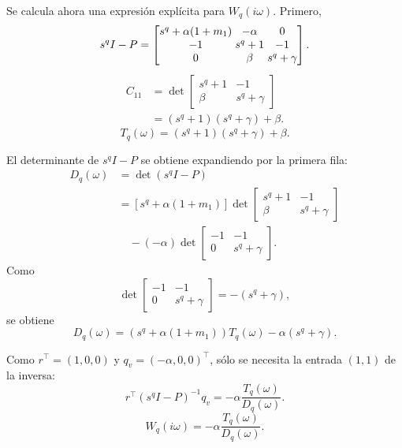 \documentclass[journal]{IEEEtran}
\begin{document}
Se calcula ahora una expresión explícita para \(W_q(i\omega)\). Primero,
\[
\begingroup
\setlength{\arraycolsep}{1.5pt}
s^q I-P
=
\begin{bmatrix}
s^q+\alpha(1+m_1)&-\alpha&0\\
-1&s^q+1&-1\\
0&\beta&s^q+\gamma
\end{bmatrix}.
\endgroup
\]
\begin{align}
C_{11}
&=
\det
\begin{bmatrix}
s^q+1&-1\\
\beta&s^q+\gamma
\end{bmatrix}  \nonumber\\
&=
\left(s^q+1\right)\left(s^q+\gamma\right)+\beta.
\end{align}
\begin{equation}
\label{eq:T_ns}
T_q(\omega)
=
\left(s^q+1\right)
\left(s^q+\gamma\right)
+\beta.
\end{equation}

El determinante de \(s^q I-P\) se obtiene expandiendo por la primera fila:
\begin{align}
D_q(\omega)
&=
\det\left(s^q I-P\right) \nonumber\\
&=
\left[s^q+\alpha(1+m_1)\right]
\det
\begin{bmatrix}
s^q+1&-1\\
\beta&s^q+\gamma
\end{bmatrix}
\nonumber\\
&\quad-
(-\alpha)
\det
\begin{bmatrix}
-1&-1\\
0&s^q+\gamma
\end{bmatrix}.
\end{align}
Como
\[
\det
\begin{bmatrix}
-1&-1\\
0&s^q+\gamma
\end{bmatrix}
=-\left(s^q+\gamma\right),
\]
se obtiene
\begin{equation}
\label{eq:D_ns}
D_q(\omega)
=
\left(s^q+\alpha(1+m_1)\right)T_q(\omega)
-\alpha\left(s^q+\gamma\right).
\end{equation}

Como \(r^\top=(1,0,0)\) y \(q_v=(-\alpha,0,0)^\top\), sólo se necesita la entrada
\((1,1)\) de la inversa:
\[
r^\top\left(s^q I-P\right)^{-1}q_v
=
-\alpha\frac{T_q(\omega)}{D_q(\omega)}.
\]
\begin{equation}
\label{eq:Wexplicit_ns}
W_q(i\omega)
=
-\alpha\frac{T_q(\omega)}{D_q(\omega)}.
\end{equation}
\end{document}
